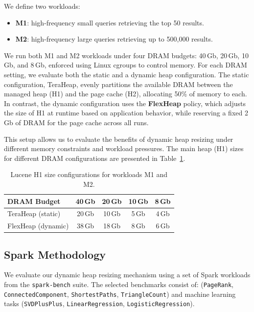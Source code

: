 We define two workloads:
\begin{itemize}[leftmargin=1.5em]
  \item \textbf{M1}: high-frequency small queries retrieving the top 50 results.
  \item \textbf{M2}: high-frequency large queries retrieving up to 500{,}000 results.
\end{itemize}

We run both M1 and M2 workloads under four DRAM budgets: 40\,Gb, 20\,Gb, 10\,Gb, and 8\,Gb,
enforced using Linux cgroups to control memory. 
For each DRAM setting, we evaluate both the static and a dynamic heap configuration. 
The static configuration, TeraHeap, evenly partitions the available DRAM between the 
managed heap (H1) and the page cache (H2), allocating 50\% of memory to each. In contrast, 
the dynamic configuration uses the \textbf{FlexHeap} policy, which adjusts the size of H1 
at runtime based on application behavior, while reserving a fixed 2\,Gb of DRAM for the page cache across all runs.

This setup allows us to evaluate the benefits of dynamic heap resizing under different memory constraints and workload pressures. 
The main heap (H1) sizes for different DRAM configurations are presented in Table~\ref{tab:lucene-configs}.


\begin{table}[H]
\centering
\renewcommand{\arraystretch}{1.1}
\caption{Lucene H1 size configurations for workloads M1 and M2.}
\label{tab:lucene-configs}
\begin{tabular}{|l|c|c|c|c|}

\hline
  \textbf{DRAM Budget} & 40\,Gb & 20\,Gb & 10\,Gb & 8\,Gb \\
\hline
  TeraHeap (static)& 20\,Gb & 10\,Gb & 5\,Gb & 4\,Gb \\
\hline
  FlexHeap (dynamic)& 38\,Gb & 18\,Gb  & 8\,Gb & 6\,Gb \\
\hline
 
\end{tabular}
\end{table}

\subsection{Spark Methodology}
\label{sec:spark-methodology}

We evaluate our dynamic heap resizing mechanism using a set of Spark workloads 
from the \texttt{spark-bench} suite. The selected benchmarks consist of:
(\texttt{PageRank}, \texttt{ConnectedComponent}, \texttt{ShortestPaths}, \texttt{TriangleCount}) 
and machine learning tasks (\texttt{SVDPlusPlus}, \texttt{LinearRegression}, \texttt{LogisticRegression}).

